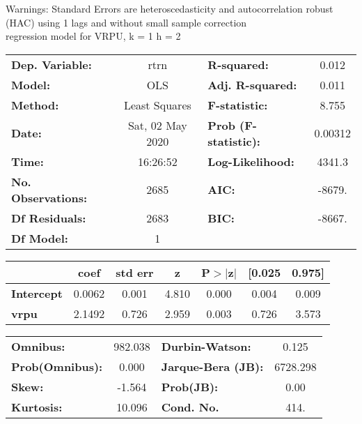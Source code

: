 Warnings: \newline
 [1] Standard Errors are heteroscedasticity and autocorrelation robust (HAC) using 1 lags and without small sample correction\\ 

regression model for VRPU, k = 1 h = 2\begin{center}
\begin{tabular}{lclc}
\toprule
\textbf{Dep. Variable:}    &       rtrn       & \textbf{  R-squared:         } &     0.012   \\
\textbf{Model:}            &       OLS        & \textbf{  Adj. R-squared:    } &     0.011   \\
\textbf{Method:}           &  Least Squares   & \textbf{  F-statistic:       } &     8.755   \\
\textbf{Date:}             & Sat, 02 May 2020 & \textbf{  Prob (F-statistic):} &  0.00312    \\
\textbf{Time:}             &     16:26:52     & \textbf{  Log-Likelihood:    } &    4341.3   \\
\textbf{No. Observations:} &        2685      & \textbf{  AIC:               } &    -8679.   \\
\textbf{Df Residuals:}     &        2683      & \textbf{  BIC:               } &    -8667.   \\
\textbf{Df Model:}         &           1      & \textbf{                     } &             \\
\bottomrule
\end{tabular}
\begin{tabular}{lcccccc}
                   & \textbf{coef} & \textbf{std err} & \textbf{z} & \textbf{P$> |$z$|$} & \textbf{[0.025} & \textbf{0.975]}  \\
\midrule
\textbf{Intercept} &       0.0062  &        0.001     &     4.810  &         0.000        &        0.004    &        0.009     \\
\textbf{vrpu}      &       2.1492  &        0.726     &     2.959  &         0.003        &        0.726    &        3.573     \\
\bottomrule
\end{tabular}
\begin{tabular}{lclc}
\textbf{Omnibus:}       & 982.038 & \textbf{  Durbin-Watson:     } &    0.125  \\
\textbf{Prob(Omnibus):} &   0.000 & \textbf{  Jarque-Bera (JB):  } & 6728.298  \\
\textbf{Skew:}          &  -1.564 & \textbf{  Prob(JB):          } &     0.00  \\
\textbf{Kurtosis:}      &  10.096 & \textbf{  Cond. No.          } &     414.  \\
\bottomrule
\end{tabular}
\end{center}

